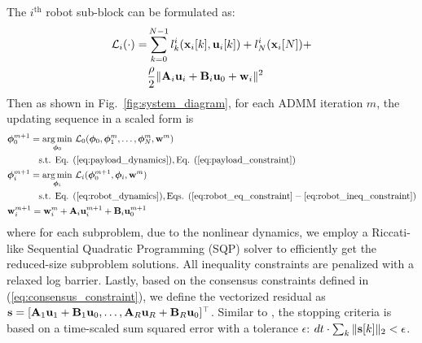 The $i^{\text{th}}$ robot sub-block can be formulated as:
\begin{equation}
    \begin{aligned}
        \mathcal{L}_i(\cdot) = & \sum_{k = 0}^{N-1}l_k^i(\mathbf{x}_{i}[k], \mathbf{u}_{i}[k]) + l_N^i(\mathbf{x}_{i}[N]) + \\
        & \frac{\rho}{2}\|\mathbf{A}_i \mathbf{u}_i+\mathbf{B}_i \mathbf{u}_0 + \mathbf{w}_i\|^2
    \end{aligned}
\end{equation}
Then as shown in Fig.~\ref{fig:system_diagram}, for each ADMM iteration $m$, the updating sequence in a scaled form is
\begin{subequations}\label{eq:updates}
    \begin{align}
       \label{eq:primal-a}
        &\bm{\phi}_0^{m+1}=\underset{\bm{\phi}_0}{\arg\min} \ \mathcal{L}_{0}(\bm{\phi}_0, \bm{\phi}_1^{m},\dots, \bm{\phi}_N^{m}, \mathbf{w}^{m})  \\\nonumber &\hspace{1.2cm} \text{s.t. Eq. }(\rm \ref{eq:payload_dynamics}), \text{Eq. }{\rm (\ref{eq:payload_constraint})}
        \\ 
        \label{eq:primal-b-i} 
        &\bm{\phi}_i^{m+1}=\underset{\bm{\phi}_i}{\arg\min} \ \mathcal{L}_{i}(\bm{\phi}_0^{m+1}, \bm{\phi}_i, \mathbf{w}^{m})\\
        \nonumber &\hspace{1.2cm} \text{s.t. Eq. }(\rm \ref{eq:robot_dynamics}), \text{Eqs. }{\rm (\ref{eq:robot_eq_constraint} - \ref{eq:robot_ineq_constraint})}\\
        &\mathbf{w}_{i}^{m+1}=\mathbf{w}_{i}^{m}+\mathbf{A}_i \mathbf{u}_i^{m+1}+\mathbf{B}_i \mathbf{u}_0^{m+1}
    \end{align}
\end{subequations}
where for each subproblem, due to the nonlinear dynamics, we employ a Riccati-like Sequential Quadratic Programming (SQP) solver to efficiently get the reduced-size subproblem solutions. All inequality constraints are penalized with a relaxed log barrier. 
Lastly, based on the consensus constraints defined in (\ref{eq:consensus_constraint}), we define the vectorized residual as $\mathbf{s} = [\mathbf{A}_1 \mathbf{u}_1 + \mathbf{B}_1 \mathbf{u}_0, \dots, \mathbf{A}_R \mathbf{u}_R + \mathbf{B}_R \mathbf{u}_0]^{\top}$. Similar to \cite{zhou2020accelerated}, the stopping criteria is based on a time-scaled sum squared error with a tolerance $\epsilon$: $dt \cdot \sum_k \|\mathbf{s}[k]\|_2 < \epsilon$.

